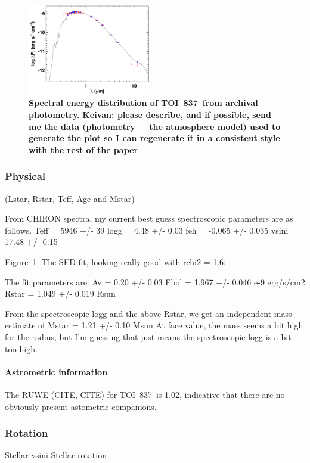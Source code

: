 \documentclass[12pt,twocolumn,tighten]{aastex62}
\newcommand{\tn}{TOI~837} %
\begin{document}
\begin{figure}[t!]
	\begin{center}
		\leavevmode
		\includegraphics[width=0.48\textwidth]{f6.png}
	\end{center}
	\vspace{-0.7cm}
	\caption{
    {\bf Spectral energy distribution of \tn\ from archival
    photometry.}
    {\bf Keivan: please describe, and if possible, send me the data
    (photometry + the atmosphere model) used to generate the plot so I
    can regenerate it in a consistent style with the rest of the paper}
    \label{fig:sed}
	}
\end{figure}

\subsubsection{Physical}
 (Lstar, Rstar, Teff, Age and Mstar)

From CHIRON spectra, my current best guess spectroscopic parameters
 are as follows.
 Teff = 5946 +/- 39
 logg = 4.48 +/- 0.03
 feh = -0.065 +/- 0.035
 vsini = 17.48 +/- 0.15

Figure~\ref{fig:sed}.
The SED fit, looking really good with rchi2 = 1.6: 

The fit parameters are: 
Av = 0.20 +/- 0.03
Fbol = 1.967 +/- 0.046 e-9 erg/s/cm2 
Rstar = 1.049 +/- 0.019 Rsun 

From the spectroscopic logg and the above Rstar, we get an independent
mass estimate of 
Mstar = 1.21 +/- 0.10 Msun 
At face value, the mass seems a bit high for the radius, but I'm
guessing that just means the spectroscopic logg is a bit too high. 


\paragraph{Astrometric information}
The RUWE (CITE, CITE) for \tn\ is 1.02, indicative that there are no
obviously present astometric companions.


\subsubsection{Rotation}
Stellar vsini
Stellar rotation
\end{document}
